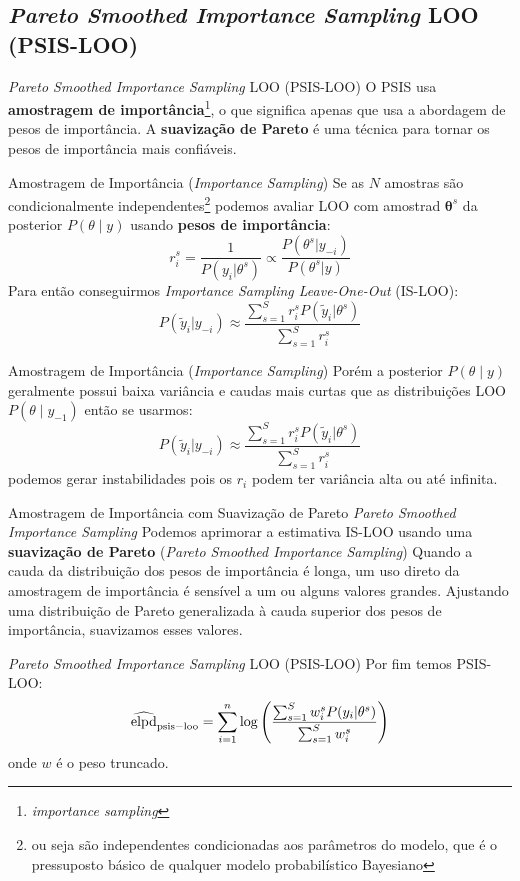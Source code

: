 \subsection{\textit{Pareto Smoothed Importance Sampling} LOO (PSIS-LOO)}
\begin{frame}{\textit{Pareto Smoothed Importance Sampling} LOO (PSIS-LOO)}
    O PSIS usa \textbf{amostragem de importância}\footnote{\textit{importance sampling}},
    o que significa apenas que usa a abordagem de pesos de importância.
    \vfill
    A \textbf{suavização de Pareto} é uma técnica para tornar os pesos de importância
    mais confiáveis.
\end{frame}
\begin{frame}{Amostragem de Importância (\textit{Importance Sampling})}
    Se as $N$ amostras são condicionalmente independentes\footnote{ou seja
    são independentes condicionadas aos parâmetros do modelo, que é o pressuposto
    básico de qualquer modelo probabilístico Bayesiano} \parencite{gelfand1992model}
    podemos avaliar LOO com amostrad $\boldsymbol{\theta}^s$ da posterior
    $P(\theta \mid y)$ usando \textbf{pesos de importância}:
    $$
    r_i^s=\frac{1}{P(y_i|\theta^s)} \propto \frac{P(\theta^s|y_{-i})}{P(\theta^s|y)}
    $$
    Para então conseguirmos \textit{Importance Sampling Leave-One-Out} (IS-LOO):
    $$
    P(\tilde{y}_i|y_{-i})
    \approx
    \frac{\sum_{s=1}^S r_i^s P(\tilde{y}_i|\theta^s)}{\sum_{s=1}^S r_i^s}
    $$
\end{frame}

\begin{frame}{Amostragem de Importância (\textit{Importance Sampling})}
    Porém a posterior $P(\theta \mid y)$ geralmente possui baixa variância e caudas
    mais curtas que as distribuições LOO $P(\theta \mid y_{-1})$ então se usarmos:
    $$
    P(\tilde{y}_i|y_{-i}) \approx \frac{\sum_{s=1}^S r_i^s P(\tilde{y}_i|\theta^s)}{\sum_{s=1}^S r_i^s}
    $$
    podemos gerar instabilidades pois os $r_i$ podem ter variância alta ou até infinita.
\end{frame}

\begin{frame}{Amostragem de Importância com Suavização de Pareto \textit{Pareto Smoothed Importance Sampling}}
    Podemos aprimorar a estimativa IS-LOO usando uma \textbf{suavização de Pareto}
    (\textit{Pareto Smoothed Importance Sampling}) \parencite{vehtariPracticalBayesianModel2015}
    \vfill
    Quando a cauda da distribuição dos pesos de importância é longa, um uso direto
    da amostragem de importância é sensível a um ou alguns valores grandes.
    Ajustando uma distribuição de Pareto generalizada à cauda superior dos pesos de
    importância, suavizamos esses valores.
\end{frame}
\begin{frame}{\textit{Pareto Smoothed Importance Sampling} LOO (PSIS-LOO)}
    Por fim temos PSIS-LOO:
    $$
    \widehat{\operatorname{elpd}}_{\rm psis-loo} =
    \sum_{i=1}^n \log
    \left(\frac{\sum_{s=1}^S w_i^s P(y_i|\theta^s)}{\sum_{s=1}^Sw_i^s} \right)
    $$
    onde $w$ é o peso truncado.
\end{frame}

